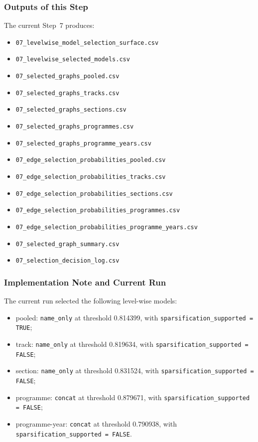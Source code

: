 \subsubsection{Outputs of this Step}
\label{sec:step7_outputs}

The current Step~7 produces:
\begin{itemize}
    \item \texttt{07\_levelwise\_model\_selection\_surface.csv}
    \item \texttt{07\_levelwise\_selected\_models.csv}
    \item \texttt{07\_selected\_graphs\_pooled.csv}
    \item \texttt{07\_selected\_graphs\_tracks.csv}
    \item \texttt{07\_selected\_graphs\_sections.csv}
    \item \texttt{07\_selected\_graphs\_programmes.csv}
    \item \texttt{07\_selected\_graphs\_programme\_years.csv}
    \item \texttt{07\_edge\_selection\_probabilities\_pooled.csv}
    \item \texttt{07\_edge\_selection\_probabilities\_tracks.csv}
    \item \texttt{07\_edge\_selection\_probabilities\_sections.csv}
    \item \texttt{07\_edge\_selection\_probabilities\_programmes.csv}
    \item \texttt{07\_edge\_selection\_probabilities\_programme\_years.csv}
    \item \texttt{07\_selected\_graph\_summary.csv}
    \item \texttt{07\_selection\_decision\_log.csv}
\end{itemize}

\subsubsection{Implementation Note and Current Run}
\label{sec:step7_implementation_note}

The current run selected the following level-wise models:
\begin{itemize}
    \item pooled: \texttt{name\_only} at threshold 0.814399, with \texttt{sparsification\_supported = TRUE};
    \item track: \texttt{name\_only} at threshold 0.819634, with \texttt{sparsification\_supported = FALSE};
    \item section: \texttt{name\_only} at threshold 0.831524, with \texttt{sparsification\_supported = FALSE};
    \item programme: \texttt{concat} at threshold 0.879671, with \texttt{sparsification\_supported = FALSE};
    \item programme-year: \texttt{concat} at threshold 0.790938, with \texttt{sparsification\_supported = FALSE}.
\end{itemize}

